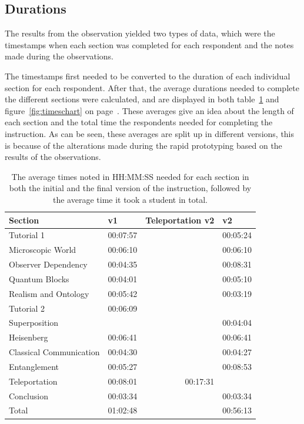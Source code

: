 \documentclass[11pt,twoside]{report} %
\begin{document}
\subsection{Durations}

The results from the observation yielded two types of data, which were the timestamps when each section was completed for each respondent and the notes made during the observations.

The timestamps first needed to be converted to the duration of each individual section for each respondent. After that, the average durations needed to complete the different sections were calculated, and are displayed in both table~\ref{tab:timetable} and figure~\ref{fig:timeschart} on page~\pageref{fig:timeschart}. These averages give an idea about the length of each section and the total time the respondents needed for completing the instruction. As can be seen, these averages are split up in different versions, this is because of the alterations made during the rapid prototyping based on the results of the observations.

\begin{table}[htbp]
\begin{center}
\begin{tabular}{|l|r|l|r|}
\hline
Section & \multicolumn{1}{l|}{v1} & Teleportation v2 & \multicolumn{1}{l|}{v2} \\ \hline
Tutorial 1 & 00:07:57 &  & 00:05:24 \\ \hline
Microscopic World & 00:06:10 &  & 00:06:10 \\ \hline
Observer Dependency & 00:04:35 &  & 00:08:31 \\ \hline
Quantum Blocks & 00:04:01 &  & 00:05:10 \\ \hline
Realism and Ontology & 00:05:42 &  & 00:03:19 \\ \hline
Tutorial 2 & 00:06:09 &  & \multicolumn{1}{l|}{} \\ \hline
Superposition & \multicolumn{1}{l|}{} &  & 00:04:04 \\ \hline
Heisenberg & 00:06:41 &  & 00:06:41 \\ \hline
Classical Communication & 00:04:30 &  & 00:04:27 \\ \hline
Entanglement & 00:05:27 &  & 00:08:53 \\ \hline
Teleportation & 00:08:01 & \multicolumn{1}{r|}{00:17:31} & \multicolumn{1}{l|}{} \\ \hline
Conclusion & 00:03:34 &  & 00:03:34 \\ \hline
Total & 01:02:48 &  & 00:56:13 \\ \hline
\end{tabular}
\caption{The average times noted in HH:MM:SS needed for each section in both the initial and the final version of the instruction, followed by the average time it took a student in total.\label{tab:timetable}}
\end{center}
\end{table}
\end{document}
